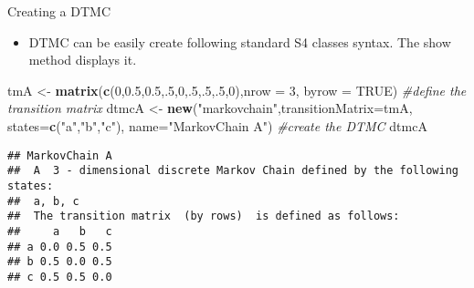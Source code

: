 \documentclass[ignorenonframetext,]{beamer}
\newenvironment{Shaded}{\begin{snugshade}}{\end{snugshade}}
\newcommand{\CommentTok}[1]{\textcolor[rgb]{0.56,0.35,0.01}{\textit{#1}}}
\newcommand{\DataTypeTok}[1]{\textcolor[rgb]{0.13,0.29,0.53}{#1}}
\newcommand{\DecValTok}[1]{\textcolor[rgb]{0.00,0.00,0.81}{#1}}
\newcommand{\FloatTok}[1]{\textcolor[rgb]{0.00,0.00,0.81}{#1}}
\newcommand{\KeywordTok}[1]{\textcolor[rgb]{0.13,0.29,0.53}{\textbf{#1}}}
\newcommand{\NormalTok}[1]{#1}
\newcommand{\OtherTok}[1]{\textcolor[rgb]{0.56,0.35,0.01}{#1}}
\newcommand{\StringTok}[1]{\textcolor[rgb]{0.31,0.60,0.02}{#1}}
\providecommand{\tightlist}{%
  \setlength{\itemsep}{0pt}\setlength{\parskip}{0pt}}
\providecommand{\tightlist}{
  \setlength{\itemsep}{0pt}\setlength{\parskip}{0pt}
}
\begin{document}
\begin{frame}[fragile]

\begin{block}{Creating a DTMC}

\begin{itemize}
\tightlist
\item
  DTMC can be easily create following standard S4 classes syntax. The
  show method displays it.
\end{itemize}

\begin{Shaded}
\begin{Highlighting}[]
\NormalTok{tmA <-}\StringTok{ }\KeywordTok{matrix}\NormalTok{(}\KeywordTok{c}\NormalTok{(}\DecValTok{0}\NormalTok{,}\FloatTok{0.5}\NormalTok{,}\FloatTok{0.5}\NormalTok{,.}\DecValTok{5}\NormalTok{,}\DecValTok{0}\NormalTok{,.}\DecValTok{5}\NormalTok{,.}\DecValTok{5}\NormalTok{,.}\DecValTok{5}\NormalTok{,}\DecValTok{0}\NormalTok{),}\DataTypeTok{nrow =} \DecValTok{3}\NormalTok{,}
              \DataTypeTok{byrow =} \OtherTok{TRUE}\NormalTok{) }\CommentTok{#define the transition matrix}
\NormalTok{dtmcA <-}\StringTok{ }\KeywordTok{new}\NormalTok{(}\StringTok{"markovchain"}\NormalTok{,}\DataTypeTok{transitionMatrix=}\NormalTok{tmA, }
             \DataTypeTok{states=}\KeywordTok{c}\NormalTok{(}\StringTok{"a"}\NormalTok{,}\StringTok{"b"}\NormalTok{,}\StringTok{"c"}\NormalTok{), }
             \DataTypeTok{name=}\StringTok{"MarkovChain A"}\NormalTok{) }\CommentTok{#create the DTMC}
\NormalTok{dtmcA}
\end{Highlighting}
\end{Shaded}

\begin{verbatim}
## MarkovChain A 
##  A  3 - dimensional discrete Markov Chain defined by the following states: 
##  a, b, c 
##  The transition matrix  (by rows)  is defined as follows: 
##     a   b   c
## a 0.0 0.5 0.5
## b 0.5 0.0 0.5
## c 0.5 0.5 0.0
\end{verbatim}

\end{block}

\end{frame}
\end{document}

